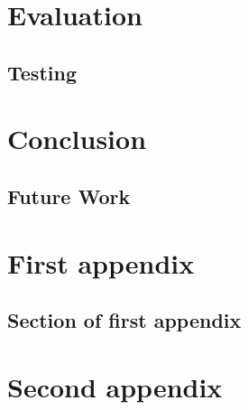\documentclass{mproj}
\begin{document}
\chapter{Evaluation}\label{evaluation}

\section{Testing}


\chapter{Conclusion}\label{conclusion}

\section{Future Work}

\appendix %
\chapter{First appendix}

\section{Section of first appendix}

\chapter{Second appendix}

\nocite{*}


\end{document}
